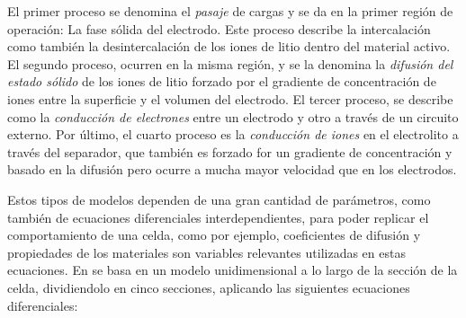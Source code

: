 \documentclass[10pt,a4paper]{article}
\begin{document}
\noindent El primer proceso se denomina el \emph{pasaje} de cargas y se da en 
la primer regi\'on de operaci\'on: La fase s\'olida del electrodo. 
Este proceso describe la intercalaci\'on como tambi\'en la desintercalaci\'on 
de los iones de litio dentro del material activo. El segundo proceso, ocurren 
en la misma regi\'on, y se la denomina la \emph{difusi\'on del estado s\'olido} 
de los iones de litio forzado por el gradiente de concentraci\'on de iones entre 
la superficie y el volumen del electrodo. El tercer proceso, se describe como 
la \emph{conducci\'on de electrones} entre un electrodo y otro a trav\'es de 
un circuito externo. Por \'ultimo, el cuarto proceso es la \emph{conducci\'on de 
iones} en el electrolito a trav\'es del separador, que tambi\'en es forzado for 
un gradiente de concentraci\'on y basado en la difusi\'on pero ocurre a mucha 
mayor velocidad que en los electrodos.

\noindent Estos tipos de modelos dependen de una gran cantidad de par\'ametros,
como tambi\'en de ecuaciones diferenciales interdependientes, para poder 
replicar el comportamiento de una celda, como por ejemplo, coeficientes de 
difusi\'on y propiedades de los materiales son variables relevantes utilizadas 
en estas ecuaciones. En \cite{Li2016} se basa en un modelo unidimensional a lo
largo de la secci\'on de la celda, dividiendolo en cinco secciones,
aplicando las siguientes ecuaciones diferenciales: 
\end{document}
